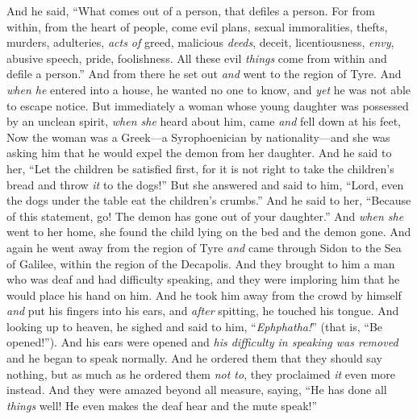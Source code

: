 \begin{biblechapter}
\verse And he said, “What comes out of a person, that defiles a person.
\verse For from within, from the heart of people, come evil plans, sexual immoralities, thefts, murders,
\verse adulteries, \textit{acts of} greed, malicious \textit{deeds}, deceit, licentiousness, \textit{envy}, abusive speech, pride, foolishness.
\verse All these evil \textit{things} come from within and defile a person.”
 And from there he set out \textit{and} went to the region of Tyre. And \textit{when he} entered into a house, he wanted no one to know, and \textit{yet} he was not able to escape notice.
\verse But immediately a woman whose young daughter was possessed by an unclean spirit, \textit{when she} heard about him, came \textit{and} fell down at his feet,
\verse Now the woman was a Greek—a Syrophoenician by nationality—and she was asking him that he would expel the demon from her daughter.
\verse And he said to her, “Let the children be satisfied first, for it is not right to take the children’s bread and throw \textit{it} to the dogs!”
\verse But she answered and said to him, “Lord, even the dogs under the table eat the children’s crumbs.”
\verse And he said to her, “Because of this statement, go! The demon has gone out of your daughter.”
\verse And \textit{when she} went to her home, she found the child lying on the bed and the demon gone.
 And again he went away from the region of Tyre \textit{and} came through Sidon to the Sea of Galilee, within the region of the Decapolis.
\verse And they brought to him a man who was deaf and had difficulty speaking, and they were imploring him that he would place his hand on him.
\verse And he took him away from the crowd by himself \textit{and} put his fingers into his ears, and \textit{after} spitting, he touched his tongue.
\verse And looking up to heaven, he sighed and said to him, “\textit{Ephphatha!}” (that is, “Be opened!”).
\verse And his ears were opened and \textit{his difficulty in speaking was removed} and he began to speak normally.
\verse And he ordered them that they should say nothing, but as much as he ordered them \textit{not to}, they proclaimed \textit{it} even more instead.
\verse And they were amazed beyond all measure, saying, “He has done all \textit{things} well! He even makes the deaf hear and the mute speak!”
\end{biblechapter}

